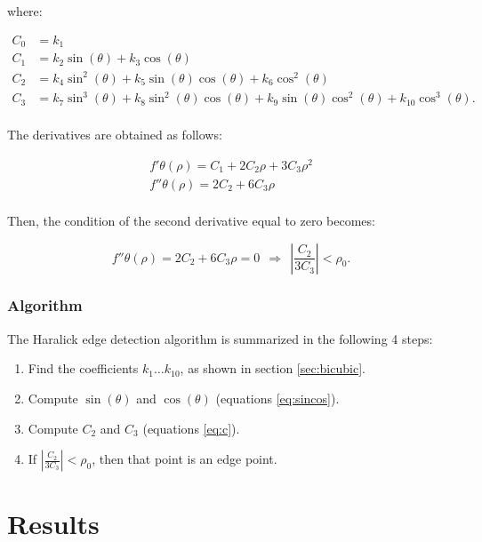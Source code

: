 \documentclass{ipol}
\numberwithin{equation}{section}
\numberwithin{table}{section}
\numberwithin{figure}{section}
\begin{document}
where:

\begin{align}
\label{eq:c}
	C_0 & = k_1 \nonumber \nonumber \\
	C_1 & = k_2\sin(\theta) + k_3\cos(\theta) \nonumber \\
	C_2 & = k_4\sin^2(\theta) + k_5\sin(\theta)\cos(\theta) + k_6\cos^2(\theta) \nonumber \\
	C_3 & = k_7\sin^3(\theta) + k_8\sin^2(\theta)\cos(\theta) + k_9\sin(\theta)\cos^2(\theta) + k_{10}\cos^3(\theta). \nonumber \\
\end{align}

The derivatives are obtained as follows:

\begin{align}
	f'{\theta}(\rho) = C_1 + 2C_2\rho + 3C_3\rho^2 \nonumber \\
	f''{\theta}(\rho) = 2C_2 + 6C_3\rho \nonumber \\
\end{align}

Then, the condition of the second derivative equal to zero becomes:

\begin{equation}
	f''{\theta}(\rho) = 2C_2 + 6C_3\rho = 0 \ \ \Rightarrow \ \ \left| \frac{C_2}{3C_3} \right| < \rho_0.
\end{equation}

\subsubsection{Algorithm}

The Haralick edge detection algorithm is summarized in the following 4 steps:

\begin{enumerate}
	\item Find the coefficients $k_1 \hdots k_{10}$, as shown in section \ref{sec:bicubic}.
	\item Compute $\sin(\theta)$ and $\cos(\theta)$ (equations \ref{eq:sincos}).
	\item Compute $C_2$ and $C_3$ (equations \ref{eq:c}).
	\item If $\left| \frac{C_2}{3C_3} \right| < \rho_0$, then that point is an edge point.
\end{enumerate}

\section{Results}
\label{sec:results}
\end{document}
